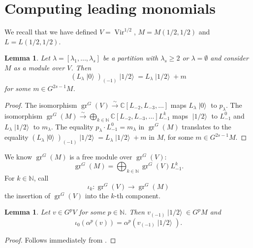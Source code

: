 \documentclass[a4paper, 12pt, reqno]{amsart}
\newtheorem{lemma}[theorem]{Lemma}
\theoremstyle{remark}
\DeclareMathOperator{\Vir}{Vir}
\DeclareMathOperator{\gr}{gr}
\DeclareMathOperator{\vac}{|0\rangle}
\DeclareMathOperator{\vachalf}{|1/2\rangle}
\begin{document}
\section{Computing leading monomials}
\label{sec:comp-lead-monom}

We recall that we have defined $V = \Vir^{1/2}$, $M = M(1/2, 1/2)$ and $L = L(1/2, 1/2)$.

\begin{lemma}
  \label{lmm:7}
  Let $\lambda = [\lambda_1, \dots, \lambda_s]$ be a partition with $\lambda_s \ge 2$ or $\lambda = \emptyset$ and consider $M$ as a module over $V$.
  Then
  \begin{equation*}
    (L_\lambda\vac)_{(-1)}\vachalf = L_\lambda\vachalf + m
  \end{equation*}
  for some $m \in G^{2s - 1}M$.
\end{lemma}

\begin{proof}
  The isomorphism $\gr^G(V) \xrightarrow{\sim} \mathbb{C}[L_{-2}, L_{-3}, \dots]$ maps $L_\lambda\vac$ to $p_\lambda$.
  The isomorphism $\gr^G(M) \xrightarrow{\sim} \bigoplus_{k \in \mathbb{N}}\mathbb{C}[L_{-2}, L_{-3}, \dots]L_{-1}^k$ maps $\vachalf$ to $L_{-1}^0$ and $L_\lambda\vachalf$ to $m_\lambda$.
  The equality $p_\lambda\cdot L_{-1}^0 = m_\lambda$ in $\gr^G(M)$ translates to the equality $(L_\lambda\vac)_{(-1)}\vachalf = L_\lambda\vachalf + m$ in $M$, for some $m \in G^{2s - 1}M$.
\end{proof}

We know $\gr^G(M)$ is a free module over $\gr^G(V)$:
\begin{equation*}
  \gr^G(M) = \bigoplus_{k \in \mathbb{N}}\gr^G(V)L_{-1}^k.
\end{equation*}
For $k \in \mathbb{N}$, call
\begin{equation*}
  \iota_k: \gr^G(V) \to \gr^G(M)
\end{equation*}
the insertion of $\gr^G(V)$ into the $k$-th component.

\begin{lemma}
  \label{lmm:8}
  Let $v \in G^pV$ for some $p \in \mathbb{N}$.
  Then $v_{(-1)}\vachalf \in G^pM$ and
  \begin{equation*}
    \iota_0(\alpha^p(v)) = \alpha^p(v_{(-1)}\vachalf).
  \end{equation*}
\end{lemma}

\begin{proof}
  Follows immediately from .
\end{proof}
\end{document}
